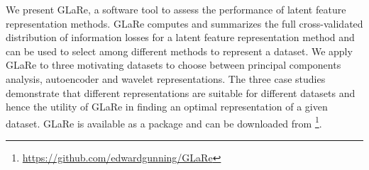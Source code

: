 

We present GLaRe, a software tool to assess the performance of latent feature representation methods.
GLaRe computes and summarizes the full cross-validated distribution of information losses for a latent feature representation method and can be used to select among different methods to represent a dataset.
We apply GLaRe to three motivating datasets to choose between principal components analysis, autoencoder and wavelet representations.
The three case studies demonstrate that different representations are suitable for different datasets and hence the utility of GLaRe in finding an optimal representation of a given dataset.
GLaRe is available as a  package and can be downloaded from \footnote{\url{https://github.com/edwardgunning/GLaRe}}.
